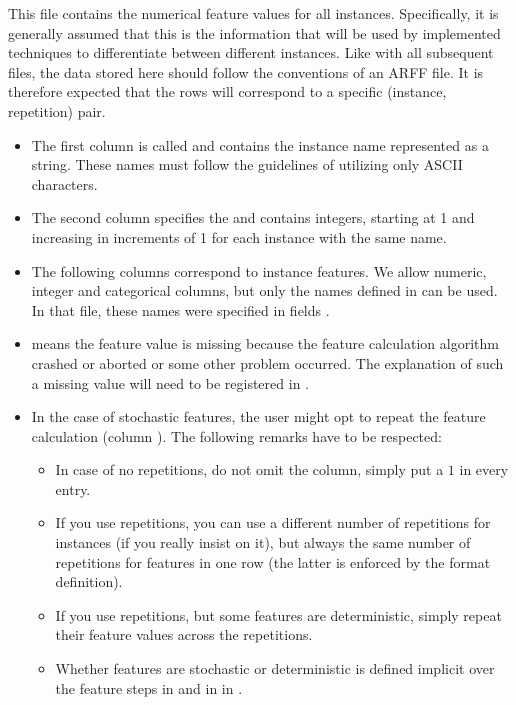 \documentclass[]{elsarticle}
\begin{document}
This file contains the numerical feature values for all instances. Specifically, it is generally assumed that this is the
information that will be used by implemented techniques to differentiate between different instances. Like with all
subsequent files, the data stored here should follow the conventions of an ARFF file. It is therefore expected that the
rows will correspond to a specific (instance, repetition) pair.


\begin{itemize}
  	\item The first column is called  and contains the instance name represented as a string. 
		These names must follow the guidelines of utilizing only ASCII characters.
  	\item The second column specifies the  and contains integers, starting at 1 and increasing in 
  		increments of 1 for each instance with the same name.  
  	\item The following columns correspond to instance features. We allow numeric, integer and categorical columns,
		but only the names defined in  can be used. In that file, these names were specified 
		in fields .
 	 \item \qm means the feature value is missing because the feature calculation algorithm crashed or aborted or
    		some other problem occurred. The explanation of such a missing value will need to be registered in 
		.
  	\item In the case of stochastic features, the user might opt to repeat the feature calculation (column
		). The following remarks have to be respected: 
        		\begin{itemize}
          		\item In case of no repetitions, do not omit the column, simply put a $1$ in every 
                          entry. 
          		\item If you use repetitions, you can use a different number of repetitions for instances (if you 
				really insist on it), but always the same number of repetitions for features in one row
                			(the latter is enforced by the format definition). 
          		\item If you use repetitions, but some features are deterministic, simply repeat their feature values 
				across the repetitions.
          		\item Whether features are stochastic or deterministic is defined implicit over the feature steps 
          		in  and  in in .
        		\end{itemize} 
\end{itemize} 
\end{document}
